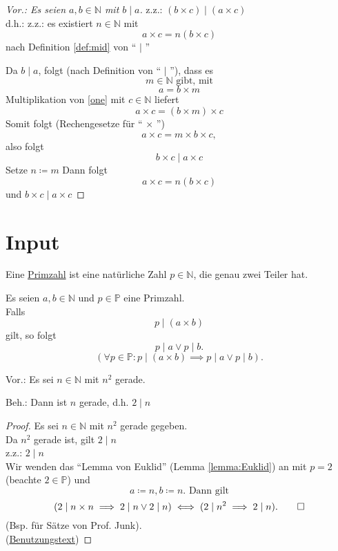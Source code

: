 \documentclass[a4paper, parskip = true, fleqn, headsepline = true]{scrartcl}
\DeclareRobustCommand{\qed}{%
	\ifmmode \tag*{$\Box$}%
	\else \leavevmode\unskip\penalty9999 \hbox{}\nobreak\hfill\quad\hbox{$\Box$}%
	\fi%
}
\begin{document}
\begin{task}
	\begin{proof}[Vor.: Es seien $ a, b \in \mathbb{N} $ mit $ b \mid a $]
		z.z.: $ ( b \times c ) \mid ( a \times c ) $\\
		d.h.: z.z.: es existiert $ n \in \mathbb{N} $ mit
		\[ a \times c = n ( b \times c ) \]
		nach Definition \ref{def:mid} von `` $\mid$ ''\par
		Da $ b \mid a $, folgt (nach Definition von `` $\mid$ ''), dass es
		\[ m \in \mathbb{N} \text{ gibt, mit} \]
		\begin{equation}
			\label{one}
			a = b \times m
		\end{equation}
		Multiplikation von \ref{one} mit $ c \in \mathbb{N} $ liefert
		\[ a \times c = ( b \times m ) \times c \]
		Somit folgt (Rechengesetze für `` $\times$ '')
		\[ a \times c = m \times b \times c, \]
		also folgt
		\[ b \times c \mid a \times c\]
		Setze $n \coloneqq m $
		Dann folgt
		\[ a \times c = n ( b \times c ) \]
		und $ b \times c \mid a \times c $
	\end{proof}
\end{task}

\section{Input}

\begin{definition}[Primzahl]
	Eine \underline{Primzahl} ist eine natürliche Zahl $ p \in \mathbb{N} $, die genau zwei Teiler hat.
\end{definition}

\begin{lemma}
	\label{lemma:Euklid}
	Es seien $ a, b \in \mathbb{N} $ und $ p \in \mathbb{P} $ eine Primzahl.\\
	Falls
	\[ p \mid ( a \times b ) \]
	gilt, so folgt
	\[ p \mid a \vee p \mid b. \]
	\[ ( \forall p \in \mathbb{P} : p \mid ( a \times b ) \implies p \mid a \vee p \mid b ). \]
\end{lemma}

\begin{task}
	Vor.: Es sei $ n \in \mathbb{N} $ mit $ n^2 $ gerade.\par
	Beh.: Dann ist $ n $ gerade, d.h. $ 2 \mid n $
	\begin{proof}
		Es sei $ n \in \mathbb{N} $ mit $ n^2 $ gerade gegeben.\\
		Da $ n^2 $ gerade ist, gilt $ 2 \mid n $\\
		z.z.: $ 2 \mid n $\\
		Wir wenden das ``Lemma von Euklid'' (Lemma \ref{lemma:Euklid}) an mit $ p = 2 $ (beachte $ 2 \in \mathbb{P} $) und
		\[ a \coloneqq n, b \coloneqq n. \text{ Dann gilt} \]
		\[ ( 2 \mid n \times n \implies 2 \mid n \vee 2 \mid n ) \iff ( 2 \mid n^2 \implies 2 \mid n ). \qed \]
		(Bsp. für  Sätze von Prof. Junk).\\
		(\underline{Benutzungstext})
	\end{proof}
\end{task}
\end{document}
